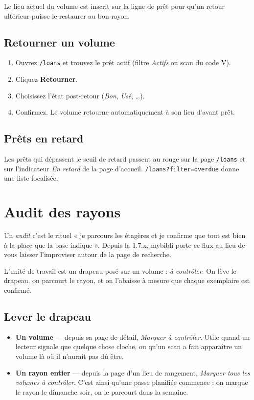 Le lieu actuel du volume est inscrit sur la ligne de prêt pour
qu'un retour ultérieur puisse le restaurer au bon rayon.

\subsection*{Retourner un volume}

\begin{enumerate}
  \item Ouvrez \texttt{/loans} et trouvez le prêt actif (filtre
        \emph{Actifs} ou scan du code V).
  \item Cliquez \textbf{Retourner}.
  \item Choisissez l'état post-retour (\emph{Bon}, \emph{Usé},
        \dots).
  \item Confirmez. Le volume retourne automatiquement à son lieu
        d'avant prêt.
\end{enumerate}

\subsection*{Prêts en retard}

Les prêts qui dépassent le seuil de retard passent au rouge sur la
page \texttt{/loans} et sur l'indicateur \emph{En retard} de la page
d'accueil. \texttt{/loans?filter=overdue} donne une liste focalisée.

\section{Audit des rayons}\label{sec:audit}

Un \emph{audit} c'est le rituel « je parcours les
étagères et je confirme que tout est bien à la place que la base
indique ». Depuis la 1.7.x, mybibli porte ce flux au lieu de vous
laisser l'improviser autour de la page de recherche.

L'unité de travail est un drapeau posé sur un volume :
\emph{à contrôler}. On lève le drapeau, on parcourt le rayon, et on
l'abaisse à mesure que chaque exemplaire est confirmé.

\subsection*{Lever le drapeau}

\begin{itemize}
  \item \textbf{Un volume} — depuis sa page de détail,
        \emph{Marquer à contrôler}. Utile quand un lecteur signale que
        quelque chose cloche, ou qu'un scan a fait apparaître un volume
        là où il n'aurait pas dû être.
  \item \textbf{Un rayon entier} — depuis la page d'un lieu de
        rangement, \emph{Marquer tous les volumes à contrôler}. C'est
        ainsi qu'une passe planifiée commence : on marque le rayon le
        dimanche soir, on le parcourt dans la semaine.
\end{itemize}


